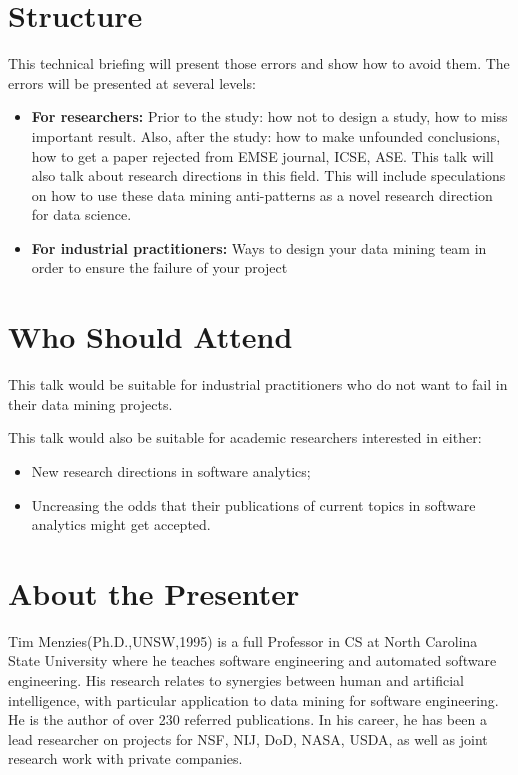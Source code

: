 \documentclass{sig-alternate}
\begin{document}
\section{Structure}

This technical briefing will present those errors and show how to avoid them. The errors will be presented at several levels:

\begin{itemize}
\item
{\bf For researchers:} Prior to the study: how not to design a study, how to miss important result. Also, after the study: how to make unfounded conclusions, how to get a paper rejected from EMSE journal, ICSE, ASE.   This talk will also talk about research directions in this field. This will include speculations on how to use these data mining anti-patterns as a novel research direction for data science.  
\item
{\bf For industrial practitioners:} Ways to design your data mining team in order to ensure the failure of your project
\end{itemize}



\section{Who Should Attend}

This talk would be suitable for industrial practitioners who do not want to fail in their data mining projects.

This talk would also be suitable for academic researchers interested in either:

\begin{itemize}
\item
New research directions in software analytics;
\item
Uncreasing the odds that their publications of current topics in
software analytics might get accepted.
\end{itemize}

\section{About the Presenter}

Tim Menzies(Ph.D.,UNSW,1995) is a full Professor in CS at North Carolina State University where he teaches software engineering and automated software engineering. His research relates to synergies between human and artificial intelligence, with particular application to data mining for software engineering.   He is the author of over 230 referred publications. In his career, he has been a lead researcher on projects for NSF, NIJ, DoD, NASA, USDA, as well as joint research work with private companies.  
\end{document}
